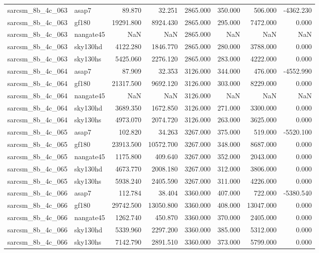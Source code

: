 \begin{tabular}{llrrrrrr}
sarcsm\_8b\_4c\_063 & asap7 & 89.870 & 32.251 & 2865.000 & 350.000 & 506.000 & -4362.230 \\
sarcsm\_8b\_4c\_063 & gf180 & 19291.800 & 8924.430 & 2865.000 & 295.000 & 7472.000 & 0.000 \\
sarcsm\_8b\_4c\_063 & nangate45 & NaN & NaN & 2865.000 & NaN & NaN & NaN \\
sarcsm\_8b\_4c\_063 & sky130hd & 4122.280 & 1846.770 & 2865.000 & 280.000 & 3788.000 & 0.000 \\
sarcsm\_8b\_4c\_063 & sky130hs & 5425.060 & 2276.120 & 2865.000 & 283.000 & 4222.000 & 0.000 \\
sarcsm\_8b\_4c\_064 & asap7 & 87.909 & 32.353 & 3126.000 & 344.000 & 476.000 & -4552.990 \\
sarcsm\_8b\_4c\_064 & gf180 & 21317.500 & 9692.120 & 3126.000 & 303.000 & 8229.000 & 0.000 \\
sarcsm\_8b\_4c\_064 & nangate45 & NaN & NaN & 3126.000 & NaN & NaN & NaN \\
sarcsm\_8b\_4c\_064 & sky130hd & 3689.350 & 1672.850 & 3126.000 & 271.000 & 3300.000 & 0.000 \\
sarcsm\_8b\_4c\_064 & sky130hs & 4973.070 & 2074.720 & 3126.000 & 263.000 & 3625.000 & 0.000 \\
sarcsm\_8b\_4c\_065 & asap7 & 102.820 & 34.263 & 3267.000 & 375.000 & 519.000 & -5520.100 \\
sarcsm\_8b\_4c\_065 & gf180 & 23913.500 & 10572.700 & 3267.000 & 348.000 & 8687.000 & 0.000 \\
sarcsm\_8b\_4c\_065 & nangate45 & 1175.800 & 409.640 & 3267.000 & 352.000 & 2043.000 & 0.000 \\
sarcsm\_8b\_4c\_065 & sky130hd & 4673.770 & 2008.180 & 3267.000 & 312.000 & 3806.000 & 0.000 \\
sarcsm\_8b\_4c\_065 & sky130hs & 5938.240 & 2405.590 & 3267.000 & 311.000 & 4226.000 & 0.000 \\
sarcsm\_8b\_4c\_066 & asap7 & 112.784 & 38.404 & 3360.000 & 407.000 & 722.000 & -5380.540 \\
sarcsm\_8b\_4c\_066 & gf180 & 29742.500 & 13050.800 & 3360.000 & 408.000 & 13047.000 & 0.000 \\
sarcsm\_8b\_4c\_066 & nangate45 & 1262.740 & 450.870 & 3360.000 & 370.000 & 2405.000 & 0.000 \\
sarcsm\_8b\_4c\_066 & sky130hd & 5339.960 & 2297.200 & 3360.000 & 385.000 & 5312.000 & 0.000 \\
sarcsm\_8b\_4c\_066 & sky130hs & 7142.790 & 2891.510 & 3360.000 & 373.000 & 5799.000 & 0.000 \\

\end{tabular}
